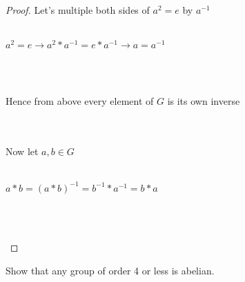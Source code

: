 \documentclass[12pt]{article}
\newenvironment{problem}[2][Problem]{\begin{trivlist}
\item[\hskip \labelsep {\bfseries #1}\hskip \labelsep {\bfseries #2.}]}{\end{trivlist}}
\begin{document}
\begin{proof}
Let's multiple both sides of $a^2 = e$ by $a^{-1}$ \\ \\
\centerline{$a^2 = e \rightarrow a^2 *a^{-1} = e * a^{-1} \rightarrow a = a^{-1}$} \\ \\
\centerline{Hence from above every element of $G$ is its own inverse} \\ \\
Now let $a,b \in G$ \\ \\
\centerline{$a*b = (a*b)^{-1}=b^{-1}*a^{-1}=b*a$} \\ \\

\centerline{}
\end{proof}

\begin{problem}{2.1.13}
Show that any group of order 4 or less is abelian.
\end{problem}
\end{document}
